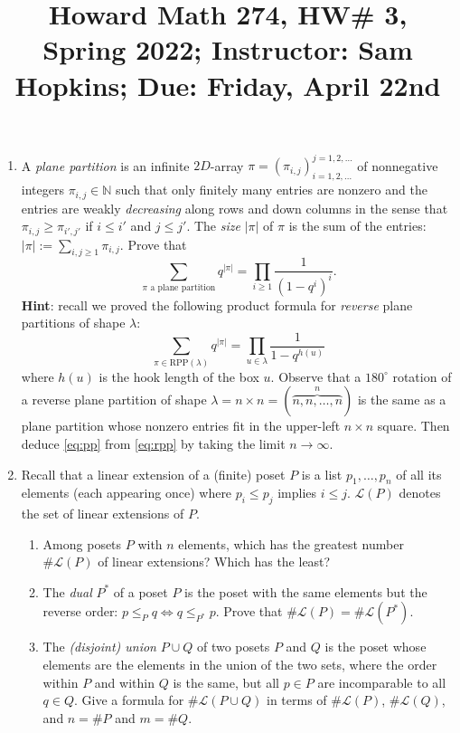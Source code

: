 \documentclass[11pt]{article}
\title{Howard Math 274, HW\# 3, \\ {\normalsize Spring 2022; Instructor: Sam Hopkins; Due: Friday, April 22nd}}
\date{}
\begin{document}
\maketitle

\thispagestyle{empty}

\vspace{-2cm}

\begin{enumerate}

\item A \emph{plane partition} is an infinite $2D$-array $\pi = (\pi_{i,j})_{i=1,2,\ldots}^{j=1,2,\ldots}$ of nonnegative integers $\pi_{i,j} \in \mathbb{N}$ such that only finitely many entries are nonzero and the entries are weakly \emph{decreasing} along rows and down columns in the sense that $\pi_{i,j} \geq \pi_{i',j'}$ if $i \leq i'$ and $j \leq j'$. The \emph{size} $|\pi|$ of $\pi$ is the sum of the entries: $|\pi| :=\sum_{i,j \geq 1} \pi_{i,j}$. Prove that 
\begin{equation} \label{eq:pp} \sum_{\textrm{$\pi$ a plane partition}} q^{|\pi|} = \prod_{i \geq 1} \frac{1}{(1-q^i)^i}. \end{equation}
{\bf Hint}: recall we proved the following product formula for \emph{reverse} plane partitions of shape $\lambda$:
\begin{equation} \label{eq:rpp} \sum_{\pi \in \mathrm{RPP}(\lambda)} q^{|\pi|} = \prod_{u \in \lambda} \frac{1}{1-q^{h(u)}} \end{equation}
where $h(u)$ is the hook length of the box $u$. Observe that a $180^\circ$ rotation of a reverse plane partition of shape $\lambda = n \times n = (\overbrace{n,n,\ldots,n}^{n})$ is the same as a plane partition whose nonzero entries fit in the upper-left $n\times n$ square. Then deduce \eqref{eq:pp} from \eqref{eq:rpp} by taking the limit $n\to \infty$.

\item Recall that a linear extension of a (finite) poset $P$ is a list $p_1,\ldots,p_n$ of all its elements (each appearing once) where $p_i \leq p_j$ implies $i \leq j$. $\mathcal{L}(P)$ denotes the set of linear extensions of $P$.
\begin{enumerate}
\item Among posets $P$ with $n$ elements, which has the greatest number $\#\mathcal{L}(P)$ of linear extensions? Which has the least?
\item The \emph{dual} $P^{*}$ of a poset $P$ is the poset with the same elements but the reverse order: $p \leq_{P} q \Leftrightarrow q \leq_{P^*} p$. Prove that $\#\mathcal{L}(P)=\#\mathcal{L}(P^*)$.
\item The \emph{(disjoint) union} $P \cup Q$ of two posets $P$ and $Q$ is the poset whose elements are the elements in the union of the two sets, where the order within $P$ and within $Q$ is the same, but all $p \in P$ are incomparable to all $q\in Q$. Give a formula for $\#\mathcal{L}(P\cup Q)$ in terms of $\#\mathcal{L}(P)$, $\#\mathcal{L}(Q)$, and $n = \#P$ and $m = \#Q$.
\end{enumerate}


\end{enumerate}
\end{document}
